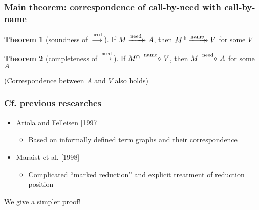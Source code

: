 \documentclass[dvipdfmx,cjk,xcolor=dvipsnames,envcountsect,notheorems,12pt]{beamer}
\theoremstyle{definition}
\newtheorem{theorem}{Theorem}
\newcommand{\xtwoheadrightarrow}[2][]{%
  \xrightarrow[#1]{#2}\mathrel{\mkern-14mu}\rightarrow
}
\newcommand{\EXPANDLET}[1]{#1^\pitchfork}
\newcommand{\CALLBYNEED}{\xrightarrow{\mathrm{need}}}
\newcommand{\RTCLOSCALLBYNEED}{\xtwoheadrightarrow{\mathrm{need}}}
\newcommand{\RTCLOSCALLBYNAME}{\xtwoheadrightarrow{\mathrm{name}}}
\begin{document}
\begin{frame}
	\frametitle{Main theorem: correspondence of call-by-need with call-by-name}
	\Large
	\begin{theorem}[soundness of $\CALLBYNEED$]
		If $M\RTCLOSCALLBYNEED A$, then $\EXPANDLET{M}\RTCLOSCALLBYNAME V$ for some $V$
	\end{theorem}
	\begin{theorem}[completeness of $\CALLBYNEED$]
		If $\EXPANDLET{M}\RTCLOSCALLBYNAME V$, then $M\RTCLOSCALLBYNEED A$ for some $A$
	\end{theorem}
	\begin{center}
		\Large (Correspondence between $A$ and $V$ also holds)
	\end{center}
\end{frame}

\begin{frame}[fragile]
	\frametitle{Cf. previous researches}
	\begin{itemize}
		\item Ariola and Felleisen [1997]
			\begin{itemize}
				\item Based on informally defined term graphs and their correspondence
			\end{itemize}
	\end{itemize}
	\begin{itemize}
		\item Maraist et al. [1998]
			\begin{itemize}
				\item Complicated ``marked reduction'' and explicit treatment of reduction position
			\end{itemize}
	\end{itemize}
	\begin{center}
		\begin{minipage}{.67\linewidth}
			\begin{block}{}
				\LARGE
				We give a \alert{simpler proof}!
			\end{block}
		\end{minipage}
	\end{center}
\end{frame}
\end{document}
